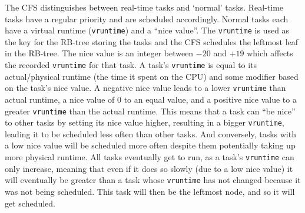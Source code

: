     The CFS distinguishes between real-time tasks and `normal' tasks. Real-time
    tasks have a regular priority and are scheduled accordingly. Normal tasks
    each have a virtual runtime (\texttt{vruntime}) and a ``nice value''. The
    \texttt{vruntime} is used as the key for the RB-tree storing the tasks and
    the CFS schedules the leftmost leaf in the RB-tree. The nice value is an
    integer between $-20$ and $+19$ which affects the recorded \texttt{vruntime}
    for that task. A task's \texttt{vruntime} is equal to its actual/physical
    runtime (the time it spent on the CPU) and some modifier based on the task's
    nice value. A negative nice value leads to a lower \texttt{vruntime} than
    actual runtime, a nice value of 0 to an equal value, and a positive nice
    value to a greater \texttt{vruntime} than the actual runtime. This means
    that a task can ``be nice'' to other tasks by setting its nice value higher,
    resulting in a bigger \texttt{vruntime}, leading it to be scheduled less
    often than other tasks. And conversely, tasks with a low nice value will be
    scheduled more often despite them potentially taking up more physical
    runtime. All tasks eventually get to run, as a task's \texttt{vruntime} can
    only increase, meaning that even if it does so slowly (due to a low nice
    value) it will eventually be greater than a task whose \texttt{vruntime} has
    not changed because it was not being scheduled. This task will then be the
    leftmost node, and so it will get scheduled.
    

